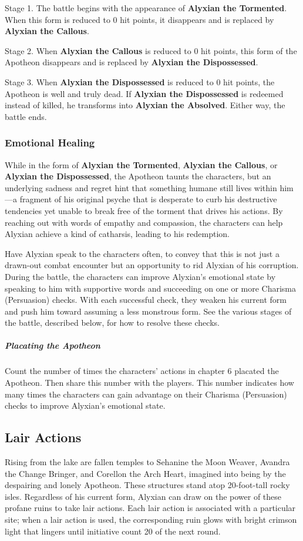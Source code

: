 \documentclass[10pt,a4paper,twoside,fancy,bg=print,twocolumn,openany,nodeprecatedcode]{dndbook}
\begin{document}
Stage 1. The battle begins with the appearance of \textbf{Alyxian the Tormented}. When this form is reduced to 0 hit points, it disappears and is replaced by \textbf{Alyxian the Callous}.

Stage 2. When \textbf{Alyxian the Callous} is reduced to 0 hit points, this form of the Apotheon disappears and is replaced by \textbf{Alyxian the Dispossessed}.

Stage 3. When \textbf{Alyxian the Dispossessed} is reduced to 0 hit points, the Apotheon is well and truly dead. If \textbf{Alyxian the Dispossessed} is redeemed instead of killed, he transforms into \textbf{Alyxian the Absolved}. Either way, the battle ends.

\subsubsection{Emotional Healing}
While in the form of \textbf{Alyxian the Tormented}, \textbf{Alyxian the Callous}, or \textbf{Alyxian the Dispossessed}, the Apotheon taunts the characters, but an underlying sadness and regret hint that something humane still lives within him—a fragment of his original psyche that is desperate to curb his destructive tendencies yet unable to break free of the torment that drives his actions. By reaching out with words of empathy and compassion, the characters can help Alyxian achieve a kind of catharsis, leading to his redemption.

Have Alyxian speak to the characters often, to convey that this is not just a drawn-out combat encounter but an opportunity to rid Alyxian of his corruption. During the battle, the characters can improve Alyxian's emotional state by speaking to him with supportive words and succeeding on one or more Charisma (Persuasion) checks. With each successful check, they weaken his current form and push him toward assuming a less monstrous form. See the various stages of the battle, described below, for how to resolve these checks.

\subparagraph{Placating the Apotheon}
Count the number of times the characters' actions in chapter 6 placated the Apotheon. Then share this number with the players. This number indicates how many times the characters can gain advantage on their Charisma (Persuasion) checks to improve Alyxian's emotional state.

\subsection{Lair Actions}
Rising from the lake are fallen temples to Sehanine the Moon Weaver, Avandra the Change Bringer, and Corellon the Arch Heart, imagined into being by the despairing and lonely Apotheon. These structures stand atop 20-foot-tall rocky isles. Regardless of his current form, Alyxian can draw on the power of these profane ruins to take lair actions. Each lair action is associated with a particular site; when a lair action is used, the corresponding ruin glows with bright crimson light that lingers until initiative count 20 of the next round.
\end{document}
